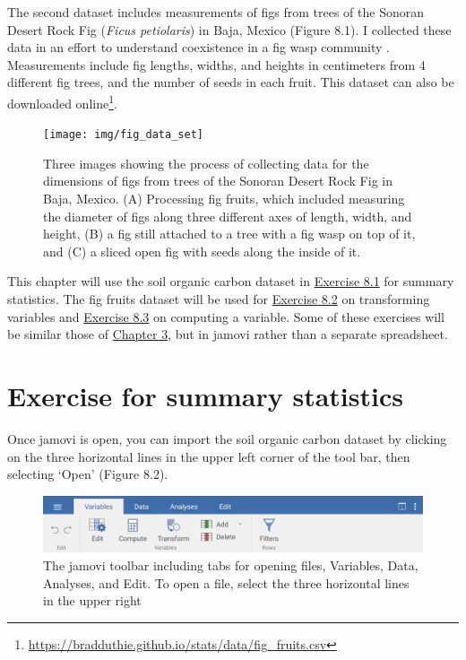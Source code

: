 \documentclass[
  openany]{krantz}
\begin{document}
The second dataset includes measurements of figs from trees of the Sonoran Desert Rock Fig (\emph{Ficus petiolaris}) in Baja, Mexico (Figure 8.1).
I collected these data in an effort to understand coexistence in a fig wasp community \citep{Duthie2015b, Duthie2016}.
Measurements include fig lengths, widths, and heights in centimeters from 4 different fig trees, and the number of seeds in each fruit.
This dataset can also be downloaded online\footnote{\url{https://bradduthie.github.io/stats/data/fig_fruits.csv}}.

\begin{figure}
\texttt{[image: img/fig\_data\_set]} \caption{Three images showing the process of collecting data for the dimensions of figs from trees of the Sonoran Desert Rock Fig in Baja, Mexico. (A) Processing fig fruits, which included measuring the diameter of figs along three different axes of length, width, and height, (B) a fig still attached to a tree with a fig wasp on top of it, and (C) a sliced open fig with seeds along the inside of it.}\label{fig:unnamed-chunk-23}
\end{figure}

This chapter will use the soil organic carbon dataset in \protect\hyperlink{02_summary_statistics}{Exercise 8.1} for summary statistics.
The fig fruits dataset will be used for \protect\hyperlink{02_transforming_variables}{Exercise 8.2} on transforming variables and \protect\hyperlink{02_computing_variables}{Exercise 8.3} on computing a variable.
Some of these exercises will be similar those of \protect\hyperlink{Chapter_3}{Chapter 3}, but in jamovi rather than a separate spreadsheet.

\hypertarget{summary_statistics_02}{%
\section{Exercise for summary statistics}\label{summary_statistics_02}}

Once jamovi is open, you can import the soil organic carbon dataset by clicking on the three horizontal lines in the upper left corner of the tool bar, then selecting `Open' (Figure 8.2).

\begin{figure}
\includegraphics[width=1\linewidth]{img/jamovi_toolbar} \caption{The jamovi toolbar including tabs for opening files, Variables, Data, Analyses, and Edit. To open a file, select the three horizontal lines in the upper right}\label{fig:unnamed-chunk-25}
\end{figure}
\end{document}
